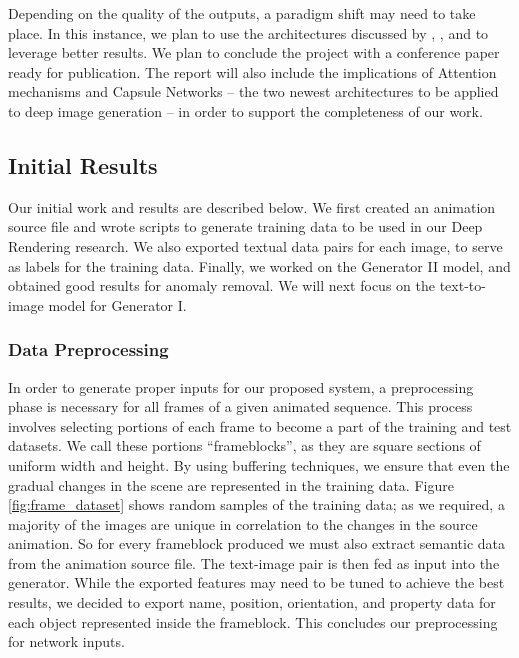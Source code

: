 \documentclass{article}
\begin{document}
Depending on the quality of the outputs, a paradigm shift may need to take place.
In this instance, we plan to use the architectures discussed by
\cite{image_transformer}, \cite{sparse_transformers}, and
\cite{3D_capsule_networks} to leverage better
results. We plan to conclude the project with a conference paper ready for
publication. The report will also include the implications of Attention
mechanisms and Capsule Networks -- the two newest architectures to be applied
to deep image generation -- in order to support the completeness
of our work.

\subsection{Initial Results}
\label{subsec:initial}
Our initial work and results are described below.
We first created an animation source file and wrote scripts
to generate training data to be used in our Deep Rendering research.
We also exported textual data pairs for each image, to serve as labels for
the training data. Finally, we worked on the Generator II model, and obtained
good results for anomaly removal. We will next focus on the text-to-image
model for Generator I.

\subsubsection{Data Preprocessing}
\label{subsubsec:data}
In order to generate proper inputs for our proposed system,
a preprocessing phase is necessary for all frames of a given
animated sequence. This process involves selecting portions of each frame
to become a part of the training and test datasets.
We call these portions ``frameblocks'', as they are square sections
of uniform width and height.
By using buffering techniques, we ensure that even the gradual changes in the 
scene are represented in the training data.
Figure \ref{fig:frame_dataset} shows random samples of the training data;
as we required, a majority of the images are unique in correlation to the changes
in the source animation.
So for every frameblock produced
we must also extract semantic data from the animation source file.
The text-image pair is then fed as input into the generator.
While the exported features may need to be tuned to achieve the best results,
we decided to export name, position, orientation, and property data for each
object represented inside the frameblock. This concludes our preprocessing
for network inputs.
\end{document}
